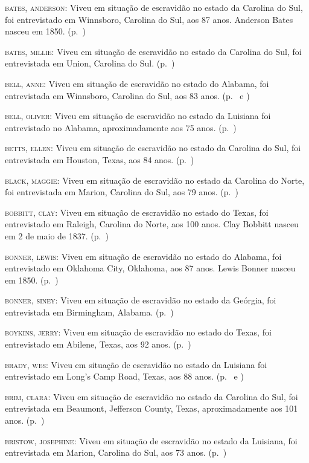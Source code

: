 \begin{Parskip}
\textsc{bates, anderson:} Viveu em situação de escravidão no estado da Carolina do Sul, foi
entrevistado em Winnsboro, Carolina do Sul, aos 87 anos. Anderson Bates
nasceu em 1850. (p.~\pageref{ref20})

\textsc{bates, millie:} Viveu em situação de escravidão no estado da Carolina do Sul, foi
entrevistada em Union, Carolina do Sul. (p.~\pageref{ref21})

\textsc{bell, anne:} Viveu em situação de escravidão no estado do Alabama, foi entrevistada em
Winnsboro, Carolina do Sul, aos 83 anos. (p.~\pageref{ref22} e \pageref{ref23})

\textsc{bell, oliver:} Viveu em situação de escravidão no estado da Luisiana foi entrevistado no
Alabama, aproximadamente aos 75 anos. (p.~\pageref{ref24})

\textsc{betts, ellen:} Viveu em situação de escravidão no estado da Carolina do Sul, foi
entrevistada em Houston, Texas, aos 84 anos. (p.~\pageref{ref25})

\textsc{black, maggie:} Viveu em situação de escravidão no estado da Carolina do Norte, foi
entrevistada em Marion, Carolina do Sul, aos 79 anos. (p.~\pageref{ref26})

\textsc{bobbitt, clay:} Viveu em situação de escravidão no estado do Texas, foi entrevistado em
Raleigh, Carolina do Norte, aos 100 anos. Clay Bobbitt nasceu em 2 de
maio de 1837. (p.~\pageref{ref27})

\textsc{bonner, lewis:} Viveu em situação de escravidão no estado do Alabama, foi entrevistado
em Oklahoma City, Oklahoma, aos 87 anos. Lewis Bonner nasceu em 1850. (p.~\pageref{ref28})

\textsc{bonner, siney:} Viveu em situação de escravidão no estado da Geórgia, foi entrevistada
em Birmingham, Alabama. (p.~\pageref{ref29})

\textsc{boykins, jerry:} Viveu em situação de escravidão no estado do Texas, foi entrevistado em
Abilene, Texas, aos 92 anos. (p.~\pageref{ref30})

\textsc{brady, wes:} Viveu em situação de escravidão no estado da Luisiana foi entrevistado em
Long's Camp Road, Texas, aos 88 anos. (p.~\pageref{ref31} e \pageref{ref32})

\textsc{brim, clara:} Viveu em situação de escravidão no estado da Carolina do Sul, foi
entrevistada em Beaumont, Jefferson County, Texas, aproximadamente aos
101 anos. (p.~\pageref{ref33})

\textsc{bristow, josephine:} Viveu em situação de escravidão no estado da Luisiana, foi
entrevistada em Marion, Carolina do Sul, aos 73 anos. (p.~\pageref{ref34})


\end{Parskip}
